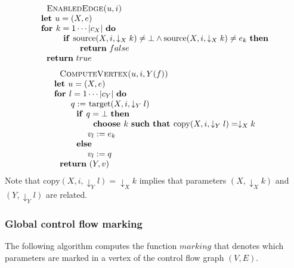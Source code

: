 \begin{equation*}
\begin{tabular}{l}
$\text{\textsc{EnabledEdge}}$\textsc{(}$u,i$\textsc{)} \\ 
\textbf{let }$u=(X,e)$ \\ 
\textbf{for }$k=1\cdots \left\vert c_{X}\right\vert $ \textbf{do} \\ 
$\qquad \text{\textbf{if }}\mathrm{source}(X,i,\downarrow _{X}k)\neq \bot
\wedge \mathrm{source}(X,i,\downarrow _{X}k)\neq e_{k}$ \textbf{then} \\ 
$\qquad \qquad \text{\textbf{return} }false$ \\ 
$\text{\textbf{return} }true$%
\end{tabular}%
\end{equation*}%
\begin{equation*}
\begin{tabular}{l}
$\text{\textsc{ComputeVertex}}$\textsc{(}$u,i,Y(f)$\textsc{)} \\ 
\textbf{let }$u=(X,e)$ \\ 
\textbf{for }$l=1\cdots \left\vert c_{Y}\right\vert $ \textbf{do} \\ 
$\qquad q:=$ $\mathrm{target}(X,i,\downarrow _{Y}l)$ \\ 
$\qquad \text{\textbf{if }}q=\bot $ \textbf{then} \\ 
$\qquad \qquad \text{\textbf{choose }}k$ \textbf{such that }$\mathrm{copy}%
(X,i,\downarrow _{Y}l)=\downarrow _{X}k$ \\ 
$\qquad \qquad v_{l}:=e_{k}$ \\ 
$\qquad \text{\textbf{else}}$ \\ 
$\qquad \qquad v_{l}:=q$ \\ 
$\text{\textbf{return} }(Y,v)$%
\end{tabular}%
\end{equation*}%
Note that $\mathrm{copy}(X,i,\downarrow _{Y}l)=\downarrow _{X}k$ implies
that parameters $(X,\downarrow _{X}k)$ and $(Y,\downarrow _{Y}l)$ are
related.

\newpage 

\subsubsection{Global control flow marking}

The following algorithm computes the function $marking$ that denotes which
parameters are marked in a vertex of the control flow graph $(V,E)$.

